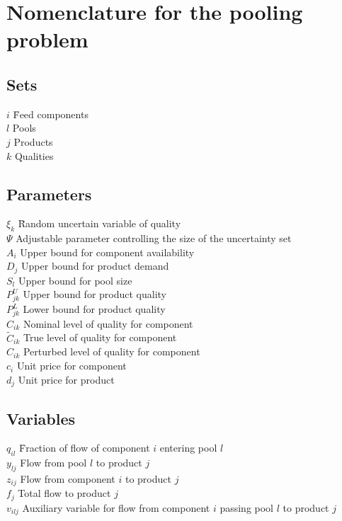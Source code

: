 \documentclass[sn-mathphys-num]{sn-jnl}
\begin{document}
\backmatter

\section*{Nomenclature for the pooling problem}
\subsection*{Sets}
\begin{tabbing}
$i$   \hspace{5em} \=   Feed components\\
$l$      \>Pools\\
$j$      \>Products \\
$k$       \>Qualities 
\end{tabbing}   

\subsection*{Parameters}
\begin{tabbing}
$\xi_k$   \hspace{5em} \=   Random uncertain variable of quality\\ %
$\Psi$  \> Adjustable parameter controlling the size of the uncertainty set\\
$A_i$   \>Upper bound for component availability\\
$D_j$       \>Upper bound for product demand\\
$S_l$       \>Upper bound for pool size \\
$P_{jk}^U$   \>Upper bound for product quality\\
$P_{jk}^L$   \>Lower bound for product quality\\
$C_{ik}$      \>Nominal level of quality for component\\
$\tilde{C}_{ik}$  \>True level of quality for component\\
$\hat{C}_{ik}$      \>Perturbed level of quality for component\\
$c_{i}$       \>Unit price for component\\
$d_{j}$       \>Unit price for product\\
\end{tabbing}  

\subsection*{Variables}
\begin{tabbing}
$q_{il}$ \hspace{5em}   \= Fraction of flow of component $i$ entering pool $l$\\
$y_{lj}$ \> Flow from pool $l$ to product $j$\\
$z_{ij}$ \> Flow from component $i$ to product $j$\\
$f_j$     \> Total flow to product $j$\\
$v_{ilj}$  \> Auxiliary variable for flow from component $i$ passing pool $l$ to product $j$
\end{tabbing}
\end{document}
